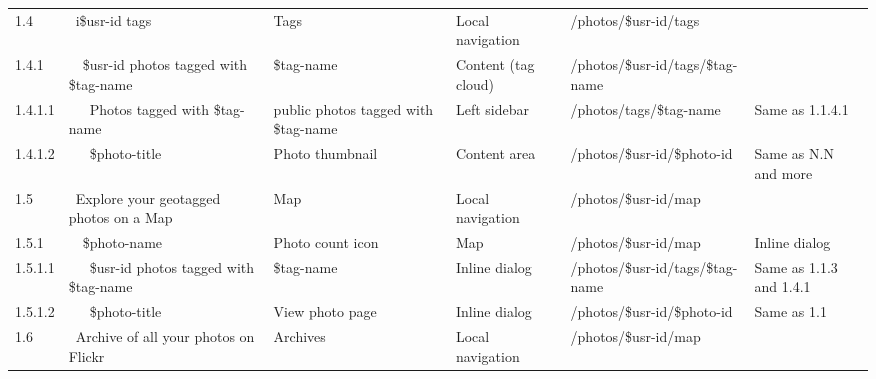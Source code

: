 \documentclass[12pt,a4paper]{article}
\begin{document}
\begin{landscape}
\begin{table}[h!b!p!]
\begin{center}
\begin{tiny}
\begin{tabular}{l|l|l|l|l|p{3cm}}
              1.4 &
              ~i\$usr-id tags &
              Tags &
              Local navigation &
              /photos/\$usr-id/tags &
              \\

                1.4.1 &
                ~~\$usr-id photos tagged with \$tag-name &
                \$tag-name &
                Content (tag cloud) &
                /photos/\$usr-id/tags/\$tag-name &
                \\

                  1.4.1.1 &
                  ~~~Photos tagged with \$tag-name &
                  public photos tagged with \$tag-name &
                  Left sidebar &
                  /photos/tags/\$tag-name &
                  Same as 1.1.4.1 \\

                  1.4.1.2 &
                  ~~~\$photo-title &
                  Photo thumbnail &
                  Content area &
                  /photos/\$usr-id/\$photo-id &
                  Same as N.N and more\\

              1.5 &
              ~Explore your geotagged photos on a Map &
              Map &
              Local navigation &
              /photos/\$usr-id/map &
              \\

                1.5.1 &
                ~~\$photo-name &
                Photo count icon &
                Map &
                /photos/\$usr-id/map &
                Inline dialog\\

                  1.5.1.1 &
                  ~~~\$usr-id photos tagged with \$tag-name &
                  \$tag-name &
                  Inline dialog &
                  /photos/\$usr-id/tags/\$tag-name &
                  Same as 1.1.3 and 1.4.1\\

                  1.5.1.2 &
                  ~~~\$photo-title &
                  View photo page &
                  Inline dialog &
                  /photos/\$usr-id/\$photo-id &
                  Same as 1.1 \\

              1.6 &
              ~Archive of all your photos on Flickr &
              Archives &
              Local navigation &
              /photos/\$usr-id/map &
              \\


\end{tabular}
\end{tiny}
\end{center}
\end{table}
\end{landscape}
\end{document}
